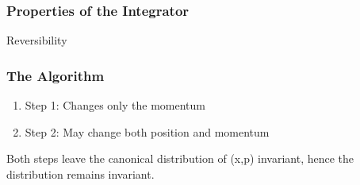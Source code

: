 \documentclass[twoside]{article}
\begin{document}
\subsubsection{Properties of the Integrator}
Reversibility

\subsubsection{The Algorithm}

\begin{enumerate}
	\item Step 1: Changes only the momentum
	\item Step 2: May change both position and momentum
\end{enumerate}
Both steps leave the canonical distribution of (x,p) invariant, hence the distribution remains invariant.
\end{document}
